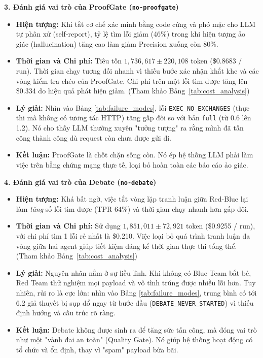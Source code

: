 \textbf{3. Đánh giá vai trò của ProofGate (\texttt{no-proofgate})}
\begin{itemize}
    \item \textbf{Hiện tượng:} Khi tắt cơ chế xác minh bằng code cứng và phó mặc cho LLM tự phân xử (self-report), tỷ lệ tìm lỗi giảm (46\%) trong khi hiện tượng ảo giác (hallucination) tăng cao làm giảm Precision xuống còn 80\%.
    \item \textbf{Thời gian và Chi phí:} Tiêu tốn $1,736,617 \pm 220,108$ token (\$0.8683 / run). Thời gian chạy tương đối nhanh vì thiếu bước xác nhận khắt khe và các vòng kiểm tra chéo của ProofGate. Chi phí trên một lỗi tìm được tăng lên \$0.334 do hiệu quả phát hiện giảm. (Tham khảo Bảng~\ref{tab:cost_analysis})
    \item \textbf{Lý giải:} Nhìn vào Bảng \ref{tab:failure_modes}, lỗi \texttt{EXEC\_NO\_EXCHANGES} (thực thi mà không có tương tác HTTP) tăng gấp đôi so với bản \texttt{full} (từ 0.6 lên 1.2). Nó cho thấy LLM thường xuyên "tưởng tượng" ra rằng mình đã tấn công thành công dù request còn chưa được gửi đi.
    \item \textbf{Kết luận:} ProofGate là chốt chặn sống còn. Nó ép hệ thống LLM phải làm việc trên bằng chứng mạng thực tế, loại bỏ hoàn toàn các báo cáo ảo giác.
\end{itemize}

\textbf{4. Đánh giá vai trò của Debate (\texttt{no-debate})}
\begin{itemize}
    \item \textbf{Hiện tượng:} Khá bất ngờ, việc tắt vòng lặp tranh luận giữa Red-Blue lại làm \textit{tăng} số lỗi tìm được (TPR 64\%) và thời gian chạy nhanh hơn gấp đôi.
    \item \textbf{Thời gian và Chi phí:} Sử dụng $1,851,011 \pm 72,921$ token (\$0.9255 / run), với chi phí tìm 1 lỗi rẻ nhất là \$0.210. Việc loại bỏ quá trình tranh luận đa vòng giữa hai agent giúp tiết kiệm đáng kể thời gian thực thi tổng thể. (Tham khảo Bảng~\ref{tab:cost_analysis})
    \item \textbf{Lý giải:} Nguyên nhân nằm ở sự liều lĩnh. Khi không có Blue Team bắt bẻ, Red Team thử nghiệm mọi payload và vô tình trúng được nhiều lỗi hơn. Tuy nhiên, rủi ro là cực lớn: nhìn vào Bảng \ref{tab:failure_modes}, trung bình có tới 6.2 giả thuyết bị sụp đổ ngay từ bước đầu (\texttt{DEBATE\_NEVER\_STARTED}) vì thiếu định hướng và cấu trúc rõ ràng.
    \item \textbf{Kết luận:} Debate không được sinh ra để tăng sức tấn công, mà đóng vai trò như một "vành đai an toàn" (Quality Gate). Nó giúp hệ thống hoạt động có tổ chức và ổn định, thay vì "spam" payload bừa bãi.
\end{itemize}

